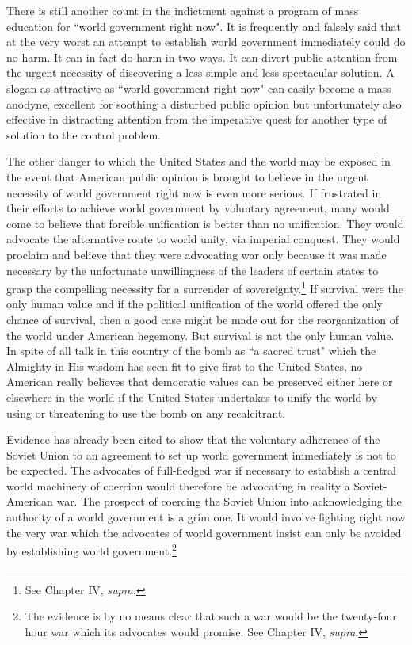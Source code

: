 There is still another count in the indictment against a program of mass education for ``world government right now". It is frequently and falsely said that at the very worst an attempt to establish world government immediately could do no harm. It can in fact do harm in two ways. It can divert public attention from the urgent necessity of discovering a less simple and less spectacular solution. A slogan as attractive as ``world government right now" can easily become a mass anodyne, excellent for soothing a disturbed public opinion but unfortunately also effective in distracting attention from the imperative quest for another type of solution to the control problem.

The other danger to which the United States and the world may be exposed in the event that American public opinion is brought to believe in the urgent necessity of world government right now is even more serious. If frustrated in their efforts to achieve world government by voluntary agreement, many would come to believe that forcible unification is better than no unification. They would advocate the alternative route to world unity, via imperial conquest. They would proclaim and believe that they were advocating war only because it was made necessary by the unfortunate unwillingness of the leaders of certain states to grasp the compelling necessity for a surrender of sovereignty.\footnote{See Chapter IV, \textit{supra}.} If survival were the only human value and if the political unification of the world offered the only chance of survival, then a good case might be made out for the reorganization of the world under American hegemony. But survival is not the only human value. In spite of all talk in this country of the bomb as ``a sacred trust" which the Almighty in His wisdom has seen fit to give first to the United States, no American really believes that democratic values can be preserved either here or elsewhere in the world if the United States undertakes to unify the world by using or threatening to use the bomb on any recalcitrant.

Evidence has already been cited to show that the voluntary adherence of the Soviet Union to an agreement to set up world government immediately is not to be expected. The advocates of full-fledged war if necessary to establish a central world machinery of coercion would therefore be advocating in reality a Soviet-American war. The prospect of coercing the Soviet Union into acknowledging the authority of a world government is a grim one. It would involve fighting right now the very war which the advocates of world government insist can only be avoided by establishing world government.\footnote{The evidence is by no means clear that such a war would be the twenty-four hour war which its advocates would promise. See Chapter IV, \textit{supra}.}

